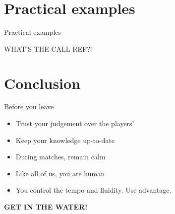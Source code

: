\documentclass{beamer}
\begin{document}
    \section{Practical examples}

    \begin{frame}{Practical examples}
        \begin{center}
            \uppercase{What's the call ref?!}
        \end{center}
    \end{frame}

    \section{Conclusion}

    \begin{frame}{Before you leave}
        \pause
        \begin{itemize}
            \item Trust your judgement over the players' \pause
            \item Keep your knowledge up-to-date \pause
            \item During matches, remain calm \pause
            \item Like all of us, you are human \pause
            \item You control the tempo and fluidity. Use advantage.
        \end{itemize}

         \pause

        \begin{center}
            \textbf{\uppercase{Get in the water!}}
        \end{center}
    \end{frame}
\end{document}
